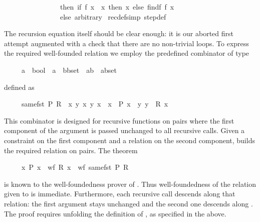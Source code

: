 \begin{isabellebody}
\ \ \ \ \ \ \ \ \ \ \ \ \ \ \ \ then\ if\ f\ x\ {\isacharequal}\ x\ then\ x\ else\ find{\isacharparenleft}f{\isacharcomma}\ f\ x{\isacharparenright}\isanewline
\ \ \ \ \ \ \ \ \ \ \ \ \ \ \ \ else\ arbitrary{\isacharparenright}{\isachardoublequote}\isanewline
{\isacharparenleft}\ recdef{\isacharunderscore}simp{\isacharcolon}\ step{}{\isacharunderscore}def{\isacharparenright}\isamarkupfalse%
%
\begin{isamarkuptext}%
\noindent
The recursion equation itself should be clear enough: it is our aborted
first attempt augmented with a check that there are no non-trivial loops.
To express the required well-founded relation we employ the
predefined combinator  of type
\begin{isabelle}%
\ \ \ \ \ {\isacharparenleft}{\isacharprime}a\ {\isasymRightarrow}\ bool{\isacharparenright}\ {\isasymRightarrow}\ {\isacharparenleft}{\isacharprime}a\ {\isasymRightarrow}\ {\isacharparenleft}{\isacharprime}b{\isasymtimes}{\isacharprime}b{\isacharparenright}set{\isacharparenright}\ {\isasymRightarrow}\ {\isacharparenleft}{\isacharparenleft}{\isacharprime}a{\isasymtimes}{\isacharprime}b{\isacharparenright}\ {\isasymtimes}\ {\isacharparenleft}{\isacharprime}a{\isasymtimes}{\isacharprime}b{\isacharparenright}{\isacharparenright}set%
\end{isabelle}
defined as
\begin{isabelle}%
\ \ \ \ \ same{\isacharunderscore}fst\ P\ R\ {\isasymequiv}\ {\isacharbraceleft}{\isacharparenleft}{\isacharparenleft}x{\isacharprime}{\isacharcomma}\ y{\isacharprime}{\isacharparenright}{\isacharcomma}\ x{\isacharcomma}\ y{\isacharparenright}{\isachardot}\ x{\isacharprime}\ {\isacharequal}\ x\ {\isasymand}\ P\ x\ {\isasymand}\ {\isacharparenleft}y{\isacharprime}{\isacharcomma}\ y{\isacharparenright}\ {\isasymin}\ R\ x{\isacharbraceright}%
\end{isabelle}
This combinator is designed for
recursive functions on pairs where the first component of the argument is
passed unchanged to all recursive calls. Given a constraint on the first
component and a relation on the second component,  builds the
required relation on pairs.  The theorem
\begin{isabelle}%
\ \ \ \ \ {\isacharparenleft}{\isasymAnd}x{\isachardot}\ P\ x\ {\isasymLongrightarrow}\ wf\ {\isacharparenleft}R\ x{\isacharparenright}{\isacharparenright}\ {\isasymLongrightarrow}\ wf\ {\isacharparenleft}same{\isacharunderscore}fst\ P\ R{\isacharparenright}%
\end{isabelle}
is known to the well-foundedness prover of .  Thus
well-foundedness of the relation given to  is immediate.
Furthermore, each recursive call descends along that relation: the first
argument stays unchanged and the second one descends along . The proof requires unfolding the definition of ,
as specified in the  above.


\end{isamarkuptext}
\end{isabellebody}
